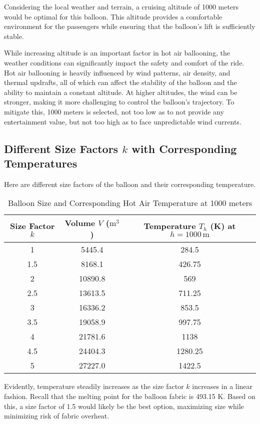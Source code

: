 \documentclass{article}
\begin{document}
Considering the local weather and terrain, a cruising altitude of 1000 meters would be optimal for this balloon. This altitude provides a comfortable environment for the passengers while ensuring that the balloon’s lift is sufficiently stable. 

While increasing altitude is an important factor in hot air ballooning, the weather conditions can significantly impact the safety and comfort of the ride. Hot air ballooning is heavily influenced by wind patterns, air density, and thermal updrafts, all of which can affect the stability of the balloon and the ability to maintain a constant altitude. At higher altitudes, the wind can be stronger, making it more challenging to control the balloon’s trajectory. To mitigate this, 1000 meters is selected, not too low as to not provide any entertainment value, but not too high as to face unpredictable wind currents.

\subsection*{Different Size Factors $k$ with Corresponding Temperatures}
Here are different size factors of the balloon and their corresponding temperature.
\begin{table}[ht]
\centering
\begin{tabular}{|c|c|c|}
\hline
\textbf{Size Factor \( k \)} & \textbf{Volume \( V \) (\( \text{m}^3 \))} & \textbf{Temperature \( T_h \) (K) at \( h = 1000 \, \text{m} \)} \\
\hline
1 & 5445.4 & 284.5 \\
1.5 & 8168.1 & 426.75 \\
2 & 10890.8 & 569 \\
2.5 & 13613.5 & 711.25 \\
3 & 16336.2 & 853.5 \\
3.5 & 19058.9 & 997.75 \\
4 & 21781.6 & 1138 \\
4.5 & 24404.3 & 1280.25 \\
5 & 27227.0 & 1422.5 \\
\hline
\end{tabular}
\caption{Balloon Size and Corresponding Hot Air Temperature at 1000 meters}
\end{table}

Evidently, temperature steadily increases as the size factor $k$ increases in a linear fashion. Recall that the melting point for the balloon fabric is 493.15 K. Based on this, a size factor of 1.5 would likely be the best option, maximizing size while minimizing risk of fabric overheat.
\end{document}
